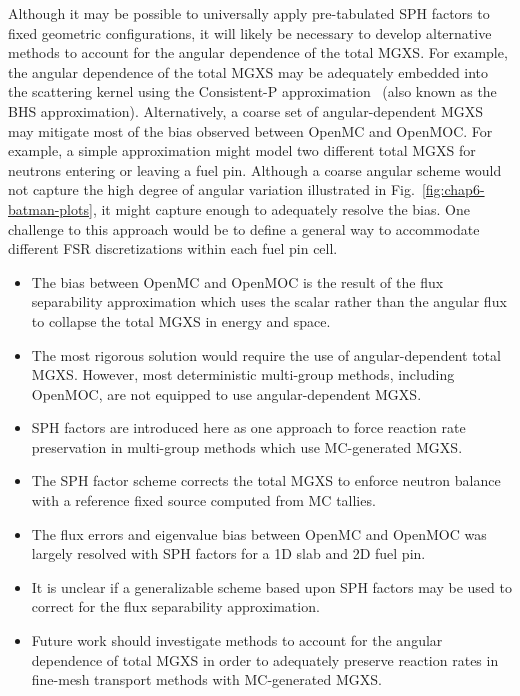 Although it may be possible to universally apply pre-tabulated \ac{SPH} factors to fixed geometric configurations, it will likely be necessary to develop alternative methods to account for the angular dependence of the total \ac{MGXS}. For example, the angular dependence of the total \ac{MGXS} may be adequately embedded into the scattering kernel using the Consistent-P approximation~\cite{bell1967transport} (also known as the BHS approximation). Alternatively, a coarse set of angular-dependent \ac{MGXS} may mitigate most of the bias observed between OpenMC and OpenMOC. For example, a simple approximation might model two different total \ac{MGXS} for neutrons entering or leaving a fuel pin. Although a coarse angular scheme would not capture the high degree of angular variation illustrated in Fig.~\ref{fig:chap6-batman-plots}, it might capture enough to adequately resolve the bias. One challenge to this approach would be to define a general way to accommodate different \ac{FSR} discretizations within each fuel pin cell.

\clearpage

\vfill
\begin{highlightsbox}[frametitle=Highlights]
\begin{itemize}
  \item The bias between OpenMC and OpenMOC is the result of the flux separability approximation which uses the scalar rather than the angular flux to collapse the total \ac{MGXS} in energy and space.
  \item The most rigorous solution would require the use of angular-dependent total \ac{MGXS}. However, most deterministic multi-group methods, including OpenMOC, are not equipped to use angular-dependent \ac{MGXS}.
  \item \ac{SPH} factors are introduced here as one approach to force reaction rate preservation in multi-group methods which use \ac{MC}-generated \ac{MGXS}.
  \item The \ac{SPH} factor scheme corrects the total \ac{MGXS} to enforce neutron balance with a reference fixed source computed from \ac{MC} tallies.
  \item The flux errors and eigenvalue bias between OpenMC and OpenMOC was largely resolved with \ac{SPH} factors for a 1D slab and 2D fuel pin.
  \item It is unclear if a generalizable scheme based upon \ac{SPH} factors may be used to correct for the flux separability approximation.
  \item Future work should investigate methods to account for the angular dependence of total \ac{MGXS} in order to adequately preserve reaction rates in fine-mesh transport methods with \ac{MC}-generated \ac{MGXS}.
\end{itemize}
\end{highlightsbox}
\vfill